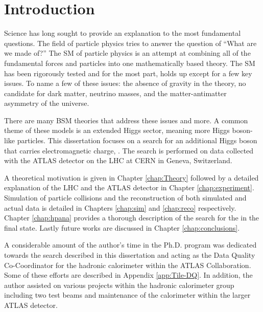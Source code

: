 \chapter{Introduction}\label{chap:Intro}
	Science has long sought to provide an explanation to the most fundamental questions. The field of particle physics tries to answer  the question of ``What are we made of?'' The \gls{SM} of particle physics is an attempt at combining all of the fundamental forces and particles into one mathematically based theory. The \gls{SM} has been rigorously tested and for the most part, holds up except for a few key issues. To name a few of these issues: the absence of gravity in the theory, no candidate for dark matter, neutrino masses, and the matter-antimatter asymmetry of the universe.

	There are many \gls{BSM} theories that address these issues and more. A common theme of these models is an extended Higgs sector, meaning more Higgs boson-like particles. This dissertation focuses on a search for an additional Higgs boson that carries electromagnetic charge, \Hpm. The search is performed on data collected with the \acrshort{ATLAS} detector on the \acrfull{LHC} at \gls{CERN} in Geneva, Switzerland. 

	A theoretical motivation is given in Chapter \ref{chap:Theory} followed by a detailed explanation of the \gls{LHC} and the \gls{ATLAS} detector in Chapter \ref{chap:experiment}. Simulation of particle collisions and the reconstruction of both simulated and actual data is detailed in Chapters \ref{chap:sim} and \ref{chap:reco} respectively. Chapter \ref{chap:hpana} provides a thorough description of the search for the \Hpm in the \taunu final state. Lastly future works are discussed in Chapter \ref{chap:conclusions}.

	A considerable amount of the author's time in the Ph.D. program was dedicated towards the search described in this dissertation and acting as the Data Quality Co-Coordinator for the hadronic calorimeter within the \gls{ATLAS} Collaboration. Some of these efforts are described in Appendix \ref{app:Tile-DQ}. In addition, the author assisted on various projects within the hadronic calorimeter group including two test beams and maintenance of the calorimeter within the larger ATLAS detector.